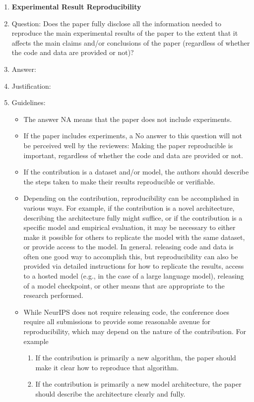 \begin{enumerate}
\item {\bf Experimental Result Reproducibility}
\item[] Question: Does the paper fully disclose all the information needed to reproduce the main experimental results of the paper to the extent that it affects the main claims and/or conclusions of the paper (regardless of whether the code and data are provided or not)?
\item[] Answer: \answerTODO{} %
\item[] Justification: \justificationTODO{}
\item[] Guidelines:
  \begin{itemize}
  \item The answer NA means that the paper does not include experiments.
  \item If the paper includes experiments, a No answer to this question will not be perceived well by the reviewers: Making the paper reproducible is important, regardless of whether the code and data are provided or not.
  \item If the contribution is a dataset and/or model, the authors should describe the steps taken to make their results reproducible or verifiable.
  \item Depending on the contribution, reproducibility can be accomplished in various ways. For example, if the contribution is a novel architecture, describing the architecture fully might suffice, or if the contribution is a specific model and empirical evaluation, it may be necessary to either make it possible for others to replicate the model with the same dataset, or provide access to the model. In general. releasing code and data is often one good way to accomplish this, but reproducibility can also be provided via detailed instructions for how to replicate the results, access to a hosted model (e.g., in the case of a large language model), releasing of a model checkpoint, or other means that are appropriate to the research performed.
  \item While NeurIPS does not require releasing code, the conference does require all submissions to provide some reasonable avenue for reproducibility, which may depend on the nature of the contribution. For example
    \begin{enumerate}
    \item If the contribution is primarily a new algorithm, the paper should make it clear how to reproduce that algorithm.
    \item If the contribution is primarily a new model architecture, the paper should describe the architecture clearly and fully.

\end{enumerate}
\end{itemize}
\end{enumerate}

